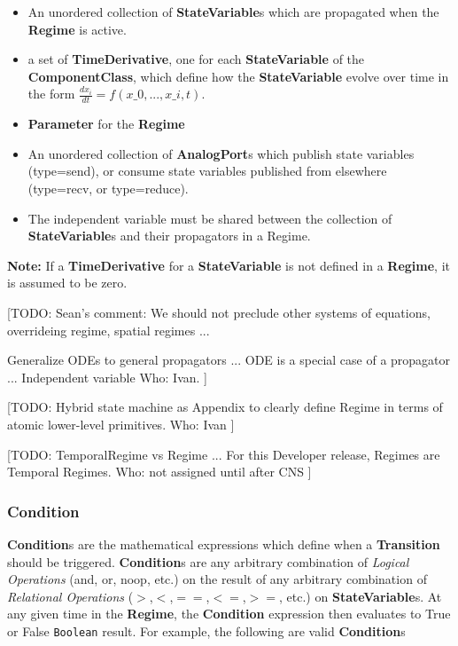\documentclass{article}
\newcommand{\note}[1]{%
\begin{center}
\colorbox{issuecolor}{\parbox{0.8\linewidth}{\textbf{Note:} #1}}
\end{center}%
}
\newcommand{\nmlClass}[1]{{\bf #1}}
\newcommand{\ComponentClass}{{\bf{ComponentClass}}\xspace}
\newcommand{\StateVariable}{{\bf{StateVariable}}\xspace}
\newcommand{\StateVariables}{{\bf{StateVariable}}s\xspace}
\newcommand{\TimeDerivative}{{\bf{TimeDerivative}}\xspace}
\newcommand{\Regime}{{\bf{Regime}}\xspace}
\newcommand{\Parameter}{{\bf{Parameter}}\xspace}
\begin{document}
\begin{itemize}
\item An unordered collection of \nmlClass{StateVariable}s which are
propagated when the \nmlClass{Regime} is active.
\item a set of \TimeDerivative, one for each \StateVariable
of the \ComponentClass, which define how the \StateVariable
evolve over time in the form $\frac{dx_{i}}{dt} = f(x\_0, ..., x\_i, t)$.
\item \Parameter for the \nmlClass{Regime}
\item An unordered collection of \nmlClass{AnalogPort}s which publish state
variables (type=send), or consume state variables published from elsewhere
(type=recv, or type=reduce).
\item The independent variable must be shared between the collection
of \StateVariables and their propagators in a Regime.
\end{itemize}

\note{If a \textbf{TimeDerivative} for a \StateVariable is not defined
in a \Regime, it is assumed to be zero.}

[TODO:
Sean's comment:
We should not preclude other systems of equations,
overrideing regime, spatial regimes ...

Generalize ODEs to general propagators ...
ODE is a special case of a propagator ...
Independent variable
Who: Ivan.
]

[TODO: Hybrid state machine as Appendix to clearly define Regime
in terms of atomic lower-level primitives.
Who: Ivan
]

[TODO:
TemporalRegime vs Regime ...
For this Developer release, Regimes are Temporal Regimes.
Who: not assigned until after CNS
]

\subsubsection{Condition}

\nmlClass{Condition}s are the mathematical expressions which define
when a \nmlClass{Transition} should be triggered.
\nmlClass{Condition}s are any arbitrary combination of \emph{Logical
Operations} (and, or, noop, etc.) on the
result of any arbitrary combination of \emph{Relational Operations}
($>$,$<$,$==$,$<=$,$>=$, etc.) on
\nmlClass{StateVariable}s. At any given time in the \nmlClass{Regime},
the \nmlClass{Condition} expression then evaluates to True or False
{\tt Boolean} result. For example, the following are valid
\nmlClass{Condition}s
\end{document}
